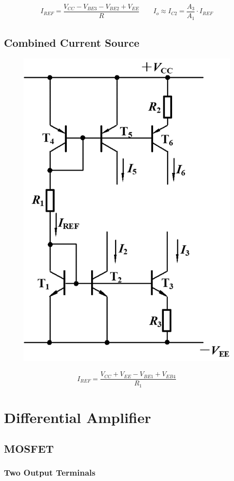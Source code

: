 \begin{equation*}
  \begin{aligned}
    I_{REF} = \dfrac{V_{CC} - V_{BE3} - V_{BE2} + V_{EE}}{R} \quad\quad 
    I_o \approx I_{C2} = \dfrac{A_3}{A_1} \cdot I_{REF} 
  \end{aligned}
\end{equation*}

\subsection{Combined Current Source}

\begin{figure}[H]
  \centering
  \includegraphics[width=0.4\linewidth]{figures/BJT-Combined-Current-Source}
\end{figure}

\begin{equation*}
  \begin{aligned}
    I_{REF} = \dfrac{V_{CC} + V_{EE} - V_{BE1} + V_{EB4}}{R_1} 
  \end{aligned}
\end{equation*}

\section{Differential Amplifier}

\subsection{MOSFET}

\subsubsection{Two Output Terminals}

